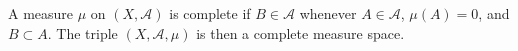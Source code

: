 A measure $\mu$ on $(X, \mathcal{A})$ is complete if $B \in \mathcal{A}$ whenever $A \in \mathcal{A}$, $\mu(A) = 0$, and $B \subset A$. The triple $(X, \mathcal{A}, \mu)$ is then a complete measure space.